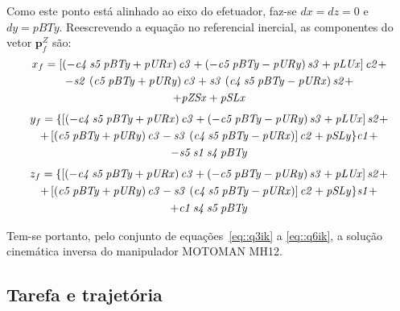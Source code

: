 Como este ponto está alinhado ao eixo do efetuador, faz-se $dx = dz = 0$ e $dy
= pBTy$.
Reescrevendo a equação no referencial inercial, as componentes do vetor
$\mathbf{p}_{f}^{Z}$ são:
%
\begin{multline}
	x_f =  \left[  \left( -{\it c4}\,{\it s5}\,{\it pBTy}+{\it pURx} \right) {
		\it c3}+ \left( -{\it c5}\,{\it pBTy}-{\it pURy} \right) {\it s3}+{
		\it pLUx} \right] {\it c2} +
		\\ -{\it s2}\, \left( {\it c5}\,{\it pBTy}+{
		\it pURy} \right) {\it c3}+{\it s3}\, \left( {\it c4}\,{\it s5}\,{\it 
		pBTy}-{\it pURx} \right) {\it s2}+
		\\ +{\it pZSx}+{\it pSLx}
\end{multline}
\vspace{-15mm}
\begin{multline}
	y_f =  \{ \left[  \left( -{\it c4}\,{\it s5}\,{\it pBTy}+{\it pURx}
 		\right) {\it c3}+ \left( -{\it c5}\,{\it pBTy}-{\it pURy} \right) {
		\it s3}+{\it pLUx} \right] {\it s2}+ 
		\\ + \left[  \left( {\it c5}\,{\it 
		pBTy}+{\it pURy} \right) {\it c3}-{\it s3}\, \left( {\it c4}\,{\it s5}
		\,{\it pBTy}-{\it pURx} \right)  \right] {\it c2}+{\it pSLy} \} {
		\it c1} +
		\\ -{\it s5}\,{\it s1}\,{\it s4}\,{\it pBTy}
\end{multline}
\vspace{-15mm}
\begin{multline}
	z_f =  \{  \left[ \left( -{\it c4}\,{\it s5}\,{\it pBTy}+{\it pURx}
 		\right) {\it c3}+ \left( -{\it c5}\,{\it pBTy}-{\it pURy} \right) {
		\it s3}+{\it pLUx} \right] {\it s2}+ 
		\\ + \left[ \left( {\it c5}\,{\it 
		pBTy}+{\it pURy} \right) {\it c3}-{\it s3}\, \left( {\it c4}\,{\it s5}
		\,{\it pBTy}-{\it pURx} \right)  \right] {\it c2}+{\it pSLy} \} {
		\it s1} +
		\\ +{\it c1}\,{\it s4}\,{\it s5}\,{\it pBTy}
\end{multline}


Tem-se portanto, pelo conjunto de equações~\ref{eq::q3ik} a \ref{eq::q6ik}, a
solução cinemática inversa do manipulador MOTOMAN MH12.


\subsection{Tarefa e trajetória} \label{sec::tarefa_traj}

